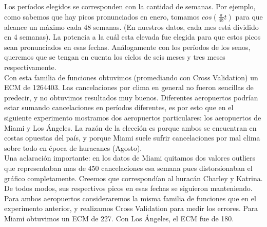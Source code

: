 Los períodos elegidos se corresponden con la cantidad de semanas. Por ejemplo, como sabemos que hay picos pronunciados en enero, tomamos $cos(\frac{\pi}{48} t)$ para que alcance un máximo cada 48 semanas. (En nuestros datos, cada mes está dividido en 4 semanas). La potencia a la cuál esta elevada fue elegida para que estos picos sean pronunciados en esas fechas. Análogamente con los períodos de los senos, queremos que se tengan en cuenta los ciclos de seis meses y tres meses respectivamente. \\

Con esta familia de funciones obtuvimos (promediando con Cross Validation) un ECM de 1264403. Las cancelaciones por clima en general no fueron sencillas de predecir, y no obtuvimos resultados muy buenos. Diferentes aeropuertos podrían estar sumando cancelaciones en períodos diferentes, es por esto que en el siguiente experimento mostramos dos aeropuertos particulares: los aeropuertos de Miami y Los Ángeles. La razón de la elección es porque ambos se encuentran en costas opuestas del país, y porque Miami suele sufrir cancelaciones por mal clima sobre todo en época de huracanes (Agosto). \\

Una aclaración importante: en los datos de Miami quitamos dos valores outliers que representaban mas de 450 cancelaciones esa semana pues distorsionaban el gráfico completamente. Creemos que correspondían al huracán Charley y Katrina. De todos modos, sus respectivos picos en esas fechas se siguieron manteniendo. \\

Para ambos aeropuertos consideraremos la misma familia de funciones que en el experimento anterior, y realizamos Cross Validation para medir los errores. Para Miami obtuvimos un ECM de 227. Con Los Ángeles, el ECM fue de 180.




